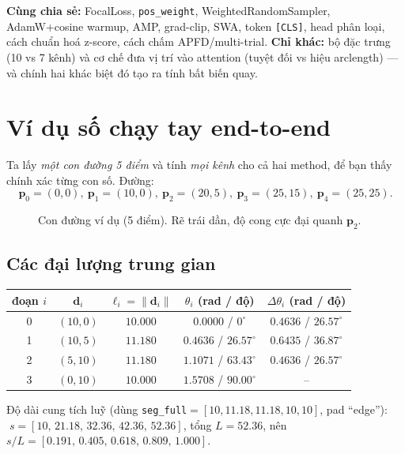 \documentclass[11pt]{article}
\newcommand{\code}[1]{\textcolor{cInk}{\texttt{#1}}}
\newcommand{\pt}{\mathbf{p}}
\theoremstyle{definition}
\begin{document}
\noindent\textbf{Cùng chia sẻ:} FocalLoss, \code{pos\_weight}, WeightedRandom\-Sampler,
AdamW+cosine warmup, AMP, grad-clip, SWA, token \code{[CLS]}, head phân loại,
cách chuẩn hoá z-score, cách chấm APFD/multi-trial. \textbf{Chỉ khác:} bộ đặc
trưng (10 vs 7 kênh) và cơ chế đưa vị trí vào attention (tuyệt đối vs hiệu
arclength) --- và chính hai khác biệt đó tạo ra tính bất biến quay.

\section{Ví dụ số chạy tay end-to-end}
\label{sec:worked}

Ta lấy \emph{một con đường 5 điểm} và tính \emph{mọi kênh} cho cả hai method, để
bạn thấy chính xác từng con số. Đường:
\[
\pt_0=(0,0),\ \pt_1=(10,0),\ \pt_2=(20,5),\ \pt_3=(25,15),\ \pt_4=(25,25).
\]

\begin{figure}[H]\centering
{}
\caption{Con đường ví dụ (5 điểm). Rẽ trái dần, độ cong cực đại quanh $\pt_2$.}
\end{figure}

\subsection{Các đại lượng trung gian}
\begin{center}\small
\begin{tabular}{@{}c c c c c@{}}
\toprule
đoạn $i$ & $\mathbf{d}_i$ & $\ell_i=\lVert\mathbf{d}_i\rVert$ &
$\theta_i$ (rad / độ) & $\Delta\theta_i$ (rad / độ)\\
\midrule
0 & $(10,0)$ & $10.000$ & $0.0000$ / $0^\circ$   & $0.4636$ / $26.57^\circ$\\
1 & $(10,5)$ & $11.180$ & $0.4636$ / $26.57^\circ$& $0.6435$ / $36.87^\circ$\\
2 & $(5,10)$ & $11.180$ & $1.1071$ / $63.43^\circ$& $0.4636$ / $26.57^\circ$\\
3 & $(0,10)$ & $10.000$ & $1.5708$ / $90.00^\circ$& --\\
\bottomrule
\end{tabular}
\end{center}
Độ dài cung tích luỹ (dùng \code{seg\_full}$=[10,11.18,11.18,10,10]$, pad
``edge''): $\;s=[10,\,21.18,\,32.36,\,42.36,\,52.36]$, tổng $L=52.36$, nên
$s/L=[0.191,\,0.405,\,0.618,\,0.809,\,1.000]$.
\end{document}
